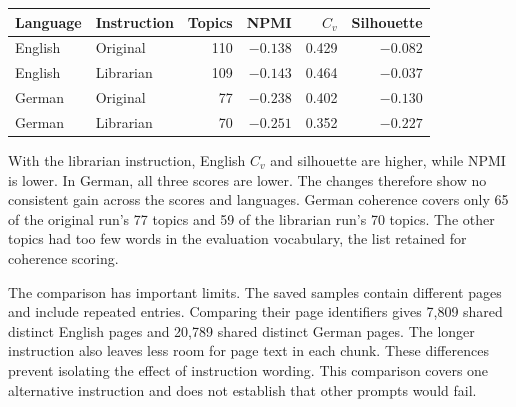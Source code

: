 \noindent\begin{minipage}{\linewidth}
\centering
{}
\label{tab:prompt-comparison}
\begin{tabular}{llrrrr}
\toprule
Language & Instruction & Topics & NPMI & $C_v$ & Silhouette \\
\midrule
English & Original  & 110 & $-0.138$ & 0.429 & $-0.082$ \\
English & Librarian & 109 & $-0.143$ & 0.464 & $-0.037$ \\
German  & Original  &  77 & $-0.238$ & 0.402 & $-0.130$ \\
German  & Librarian &  70 & $-0.251$ & 0.352 & $-0.227$ \\
\bottomrule
\end{tabular}
\end{minipage}

\measured{} With the librarian instruction, English $C_v$ and silhouette are higher, while
NPMI is lower. In German, all three scores are lower. The changes therefore show no consistent
gain across the scores and languages. German coherence covers only 65 of the original run's
77 topics and 59 of the librarian run's 70 topics. The other topics had too few words in the
evaluation vocabulary, the list retained for coherence scoring.

The comparison has important limits. \measured{} The saved samples contain different pages
and include repeated entries. Comparing their page identifiers gives 7{,}809 shared distinct
English pages and 20{,}789 shared distinct German pages. The longer instruction also leaves
less room for page text in each chunk.
These differences prevent isolating the effect of instruction wording. This comparison covers
one alternative instruction and does not establish that other prompts would fail.

